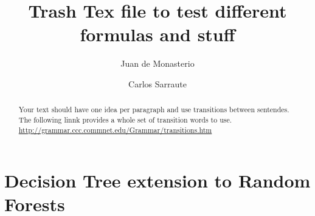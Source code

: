\documentclass{article}%
\newcommand{\Expect}{{\mathbb{E}}}
\newtheorem{definition}{Definition}[subsection]
\theoremstyle{definition}
\begin{document}
\title{Trash Tex file to test different formulas and stuff}




\author{
	Juan de Monasterio
	\and Carlos Sarraute
}

%
%


\maketitle
\begin{abstract}
	Your text should have one idea per paragraph and use transitions between sentendes. The following linnk provides a whole set of transition words to use.
	\url{http://grammar.ccc.commnet.edu/Grammar/transitions.htm}
	
	



\end{abstract} 



%
\section{Decision Tree extension to Random Forests}\label{section-randomForests}
\end{document}
